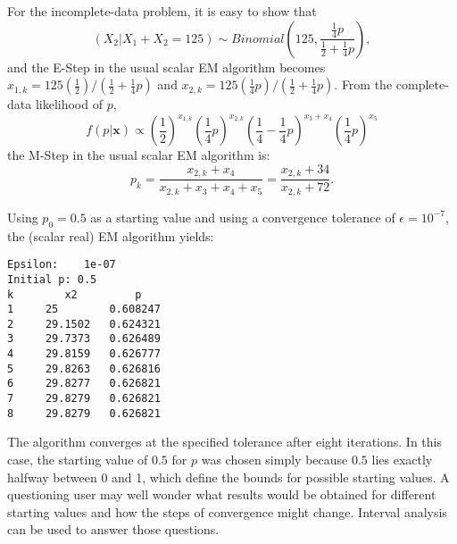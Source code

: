 \documentclass[10pt,twoside]{article}
\begin{document}
For the incomplete-data problem, it is easy to show that 
$$(X_2 | X_1 + X_2 = 125) \sim
   Binomial \left(125,
\frac{\frac{1}{4}p}{\frac{1}{2}+\frac{1}{4}p}\right),$$ 
and the E-Step in the usual scalar EM algorithm becomes
 $x_{1,k} = 125( \frac{1}{2}) / (\frac{1}{2}+\frac{1}{4}p)$ and
 $x_{2,k} = 125( \frac{1}{4}p) /(\frac{1}{2}+\frac{1}{4}p)$. 
From the complete-data likelihood of $p$,
$$ f(p|\mathbf{x}) \propto 
   \left(\frac{1}{2}\right)^{x_{1,k}} \left(\frac{1}{4}p\right)^{x_{2,k}} 
   \left(\frac{1}{4}- \frac{1}{4} p\right)^{x_3 + x_4} 
   \left(\frac{1}{4} p\right)^{x_5} $$
the M-Step in the usual scalar EM algorithm is:
$$
p_k = \frac{x_{2,k} + x_4}{x_{2,k} + x_3 + x_4 + x_5}
         =  \frac{x_{2,k} + 34}{x_{2,k} + 72} .
$$
 
Using $p_0 = 0.5$ as a starting value and using a convergence tolerance of 
$\epsilon = 10^{-7}$, the (scalar real) EM algorithm yields:
\begin{verbatim}
Epsilon:    1e-07
Initial p: 0.5
k        x2         p           
1     25        0.608247   
2     29.1502   0.624321   
3     29.7373   0.626489   
4     29.8159   0.626777   
5     29.8263   0.626816   
6     29.8277   0.626821   
7     29.8279   0.626821   
8     29.8279   0.626821   
\end{verbatim}
The algorithm converges at the specified tolerance after eight iterations.  In
this case, the starting value of $0.5$ for $p$ was chosen simply because
$0.5$
lies exactly halfway between 0 and 1, which define the bounds for possible
starting values.  A questioning user may well wonder what results would be
obtained for different starting values and how the steps of convergence
might
change.  Interval analysis can be used to answer those questions. 
\end{document}
